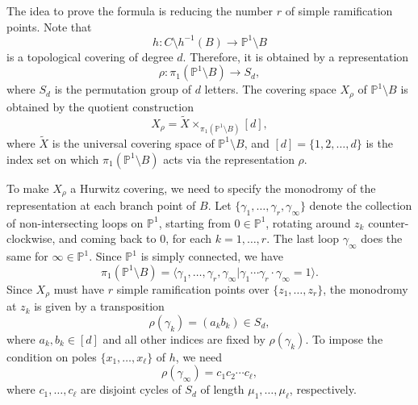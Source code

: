 \documentclass{amsart}
\theoremstyle{definition}
\numberwithin{equation}{section}
\numberwithin{figure}{section}
\def\gam{\gamma}
\newcommand{\bP}{{\mathbb{P}}}
\newcommand{\la}{{\langle}}
\newcommand{\ra}{{\rangle}}
\newcommand{\lrar}{\longrightarrow}
\begin{document}
The idea to prove the formula is reducing the number
$r$ of simple ramification points. Note that
$$
h:C\setminus h^{-1}(B) \lrar
\bP^1\setminus B
$$
is a topological covering of degree $d$. 
Therefore, it is obtained by a representation
$$
\rho:\pi_1(\bP^1\setminus B)
\lrar S_d,
$$
where $S_d$ is the permutation group of $d$ letters.
The covering space $X_\rho$ of $\bP^1\setminus B$
is obtained by the quotient construction
$$
X_\rho = 
\widetilde{X}\times_{\pi_1(\bP^1\setminus B)}
[d],
$$
where 
$\widetilde{X}$ is the universal covering space
of $\bP^1\setminus B$, and $[d]=\{1,2,\dots,d\}$ is
the index set on which $\pi_1(\bP^1\setminus B)$
acts via the representation $\rho$.

To make $X_\rho$ a Hurwitz covering, we need
to specify the monodromy of the representation
at each branch point of $B$.
Let $\{\gam_1,\dots,\gam_r,\gam_\infty\}$
denote the collection of non-intersecting loops 
on $\bP^1$, starting from $0\in\bP^1$, 
rotating around $z_k$ counter-clockwise, and 
coming back to $0$, for each $k = 1,\dots,r$.
The last loop $\gam_\infty$
does the same for  $\infty\in\bP^1$.
Since $\bP^1$ is simply connected, we have
$$
\pi_1(\bP^1\setminus B) = 
\la \gam_1,\dots,\gam_r,\gam_\infty|
\gam_1\cdots\gam_r\cdot\gam_\infty=1\ra.
$$
Since $X_\rho$ must have $r$ simple ramification
points over $\{z_1,\dots,z_r\}$, the monodromy
at $z_k$ is given by a transposition
$$
\rho(\gam_k) = (a_kb_k)\in S_d,
$$
where $a_k,b_k\in [d]$ and all other indices are fixed
by $\rho(\gam_k)$. To impose the condition on
poles $\{x_1,\dots,x_\ell\}$ of $h$, we need
$$
\rho(\gam_\infty) = c_1 c_2\cdots c_\ell,
$$
where $c_1,\dots,c_\ell$ are disjoint cycles of
$S_d$ of length $\mu_1,\dots,\mu_\ell$, respectively.
\end{document}
